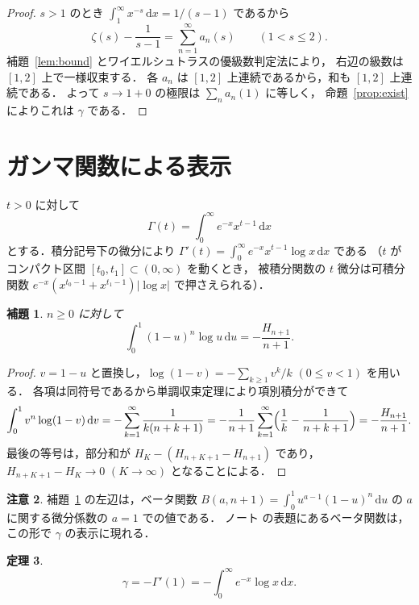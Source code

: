 \documentclass[a4paper,11pt]{ltjsarticle}
\theoremstyle{plain}
\newtheorem{theorem}{定理}[section]
\newtheorem{lemma}[theorem]{補題}
\theoremstyle{definition}
\newtheorem{remark}[theorem]{注意}
\newcommand{\dd}{\,\mathrm{d}}
\begin{document}
\begin{proof}
$s>1$ のとき $\int_1^\infty x^{-s}\dd x=1/(s-1)$ であるから
\[
  \zeta(s)-\frac{1}{s-1}=\sum_{n=1}^{\infty}a_n(s)\qquad(1<s\le2).
\]
補題~\ref{lem:bound} とワイエルシュトラスの優級数判定法により，
右辺の級数は $[1,2]$ 上で一様収束する．
各 $a_n$ は $[1,2]$ 上連続であるから，和も $[1,2]$ 上連続である．
よって $s\to1+0$ の極限は $\sum_{n}a_n(1)$ に等しく，
命題~\ref{prop:exist} によりこれは $\gamma$ である．
\end{proof}

\section{ガンマ関数による表示}

$t>0$ に対して
\[
  \Gamma(t)=\int_0^\infty e^{-x}x^{t-1}\dd x
\]
とする．積分記号下の微分により
$\Gamma'(t)=\int_0^\infty e^{-x}x^{t-1}\log x\dd x$ である
（$t$ がコンパクト区間 $[t_0,t_1]\subset(0,\infty)$ を動くとき，
被積分関数の $t$ 微分は可積分関数
$e^{-x}(x^{t_0-1}+x^{t_1-1})\lvert\log x\rvert$ で押さえられる）．

\begin{lemma}\label{lem:beta}
$n\ge0$ に対して
\[
  \int_0^1(1-u)^{n}\log u\dd u=-\frac{H_{n+1}}{n+1}.
\]
\end{lemma}

\begin{proof}
$v=1-u$ と置換し，$\log(1-v)=-\sum_{k\ge1}v^{k}/k$ $(0\le v<1)$ を用いる．
各項は同符号であるから単調収束定理により項別積分ができて
\[
  \int_0^1 v^{n}\log(1-v)\dd v
  =-\sum_{k=1}^{\infty}\frac{1}{k(n+k+1)}
  =-\frac{1}{n+1}\sum_{k=1}^{\infty}\Bigl(\frac1k-\frac{1}{n+k+1}\Bigr)
  =-\frac{H_{n+1}}{n+1}.
\]
最後の等号は，部分和が $H_K-(H_{n+K+1}-H_{n+1})$ であり，
$H_{n+K+1}-H_K\to0$ $(K\to\infty)$ となることによる．
\end{proof}

\begin{remark}
補題~\ref{lem:beta} の左辺は，ベータ関数
$B(a,n+1)=\int_0^1u^{a-1}(1-u)^{n}\dd u$ の $a$ に関する微分係数の $a=1$ での値である．
ノート \cite{Note} の表題にあるベータ関数は，この形で $\gamma$ の表示に現れる．
\end{remark}

\begin{theorem}\label{thm:gamma}
\[
  \gamma=-\Gamma'(1)=-\int_0^\infty e^{-x}\log x\dd x.
\]
\end{theorem}
\end{document}
